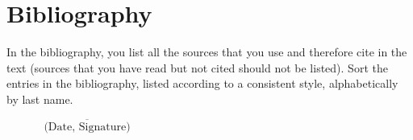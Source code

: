 \documentclass[11pt,a4paper]{article}
\begin{document}
\newpage
{}
\section*{Bibliography}
In the bibliography, you list all the sources that you use and therefore cite in the text (sources that you have read but not cited should not be listed). Sort the entries in the bibliography, listed according to a consistent style, alphabetically by last name.





\newpage

\begin{flushright}
$\overline{~~~~~~~~~~~~~~~\mbox{(Date, Signature)}~~~~~~~~~~~~~~~}$
\end{flushright}
\end{document}
